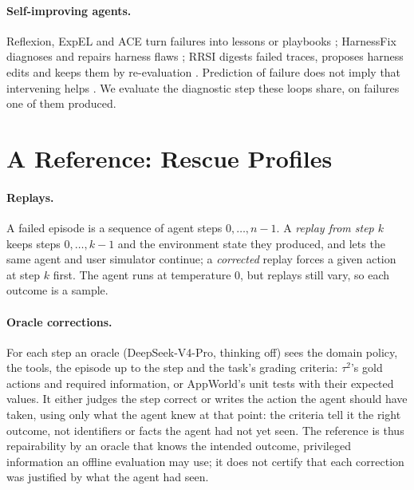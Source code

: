 \documentclass[11pt]{article}
\begin{document}
\paragraph{Self-improving agents.} Reflexion, ExpEL and ACE turn failures into lessons or playbooks \citep{shinn2023reflexion,zhao2024expel,zhang2026ace}; HarnessFix diagnoses and repairs harness flaws \citep{chen2026harnessfix}; RRSI digests failed traces, proposes harness edits and keeps them by re-evaluation \citep{rrsi2026}. Prediction of failure does not imply that intervening helps \citep{vasudev2026intervention}. We evaluate the diagnostic step these loops share, on failures one of them produced.

\section{A Reference: Rescue Profiles}
\label{sec:gt}

\paragraph{Replays.} A failed episode is a sequence of agent steps $0,\dots,n-1$. A \emph{replay from step $k$} keeps steps $0,\dots,k-1$ and the environment state they produced, and lets the same agent and user simulator continue; a \emph{corrected} replay forces a given action at step $k$ first. The agent runs at temperature 0, but replays still vary, so each outcome is a sample.

\paragraph{Oracle corrections.} For each step an oracle (DeepSeek-V4-Pro, thinking off) sees the domain policy, the tools, the episode up to the step and the task's grading criteria: $\tau^2$'s gold actions and required information, or AppWorld's unit tests with their expected values. It either judges the step correct or writes the action the agent should have taken, using only what the agent knew at that point: the criteria tell it the right outcome, not identifiers or facts the agent had not yet seen. The reference is thus repairability by an oracle that knows the intended outcome, privileged information an offline evaluation may use; it does not certify that each correction was justified by what the agent had seen.
\end{document}

